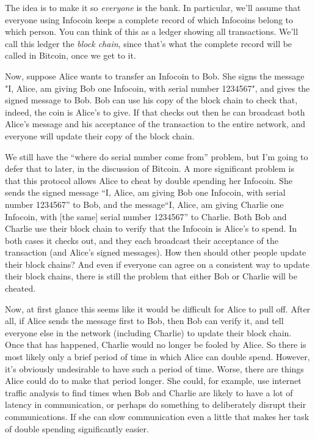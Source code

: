 \documentclass[12pt]{book}
\newcounter{problem}[chapter]
\newcounter{example}[chapter]
\begin{document}
The idea is to make it so \emph{everyone} is the bank.  In particular,
we'll assume that everyone using Infocoin keeps a complete record of
which Infocoins belong to which person.  You can think of this as a
ledger showing all transactions.  We'll call this ledger the
\emph{block chain}, since that's what the complete record will be
called in Bitcoin, once we get to it.

Now, suppose Alice wants to transfer an Infocoin to Bob.  She signs
the message "I, Alice, am giving Bob one Infocoin, with serial number
1234567", and gives the signed message to Bob.  Bob can use his copy
of the block chain to check that, indeed, the coin is Alice's to give.
If that checks out then he can broadcast both Alice's message and his
acceptance of the transaction to the entire network, and everyone will
update their copy of the block chain.

We still have the ``where do serial number come from'' problem, but
I'm going to defer that to later, in the discussion of Bitcoin.  A
more significant problem is that this protocol allows Alice to cheat
by double spending her Infocoin.  She sends the signed message ``I,
Alice, am giving Bob one Infocoin, with serial number 1234567'' to
Bob, and the message``I, Alice, am giving Charlie one Infocoin, with
[the same] serial number 1234567'' to Charlie.  Both Bob and Charlie
use their block chain to verify that the Infocoin is Alice's to spend.
In both cases it checks out, and they each broadcast their acceptance
of the transaction (and Alice's signed messages).  How then should
other people update their block chains?  And even if everyone can
agree on a consistent way to update their block chains, there is still
the problem that either Bob or Charlie will be cheated.

Now, at first glance this seems like it would be difficult for Alice
to pull off.  After all, if Alice sends the message first to Bob, then
Bob can verify it, and tell everyone else in the network (including
Charlie) to update their block chain.  Once that has happened, Charlie
would no longer be fooled by Alice. So there is most likely only a
brief period of time in which Alice can double spend.  However, it's
obviously undesirable to have such a period of time.  Worse, there are
things Alice could do to make that period longer.  She could, for
example, use internet traffic analysis to find times when Bob and
Charlie are likely to have a lot of latency in communication, or
perhaps do something to deliberately disrupt their communications.  If
she can slow communication even a little that makes her task of double
spending significantly easier.
\end{document}
